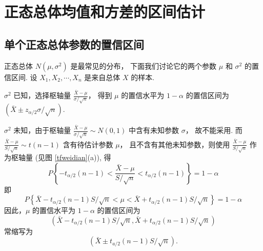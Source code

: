 \section{正态总体均值和方差的区间估计}

\subsection{单个正态总体参数的置信区间}

正态总体 $ N\left(\mu, \sigma^{2}\right) $ 是最常见的分布，
下面我们讨论它的两个参数 $ \mu $ 和 $ \sigma^{2} $ 的置信区间.
设 $ X_{1}, X_{2}, \cdots, X_{n} $ 是来自总体 $ X $ 的样本.
\begin{theorem}
    $\sigma^{2} $ 已知，选择枢轴量 $\displaystyle \frac{\bar{X}-\mu}{\sigma / \sqrt{n}}$，
    得到 $ \mu $ 的置信水平为 $ 1-\alpha $ 的置信区间为 $ \left(\bar{X} \pm z_{\alpha / 2} \sigma / \sqrt{n}\right) .$
\end{theorem}
\begin{theorem}
    $\sigma^{2} $ 未知，由于枢轴量 $\displaystyle \frac{\bar{X}-\mu}{\sigma / \sqrt{n}} \sim N(0,1) $ 中含有未知参数 $ \sigma $，
    故不能采用. 而 $\displaystyle \frac{\bar{X}-\mu}{S / \sqrt{n}} \sim t(n-1)$ 含有待估计参数 $ \mu $，
    且不含有其他未知参数，则使用 $\displaystyle \frac{\bar{X}-\mu}{S / \sqrt{n}} $ 作为枢轴量 (见图 \ref{tfweidian}(a)), 得
    $$P\left\{-t_{\alpha / 2}(n-1)<\frac{\bar{X}-\mu}{S / \sqrt{n}}<t_{\alpha / 2}(n-1)\right\}=1-\alpha$$
    即
    $$P\left\{\bar{X}-t_{\alpha / 2}(n-1) S / \sqrt{n}<\mu<\bar{X}+t_{\alpha / 2}(n-1) S / \sqrt{n}\right\}=1-\alpha$$
    因此，$\mu $ 的置信水平为 $ 1-\alpha $ 的置信区间为
    $$\left(\bar{X}-t_{\alpha / 2}(n-1) S / \sqrt{n}, \bar{X}+t_{\alpha / 2}(n-1) S / \sqrt{n}\right)$$
    常缩写为 $$\left(\bar{X} \pm t_{a / 2}(n-1) S / \sqrt{n}\right) .$$
\end{theorem}

